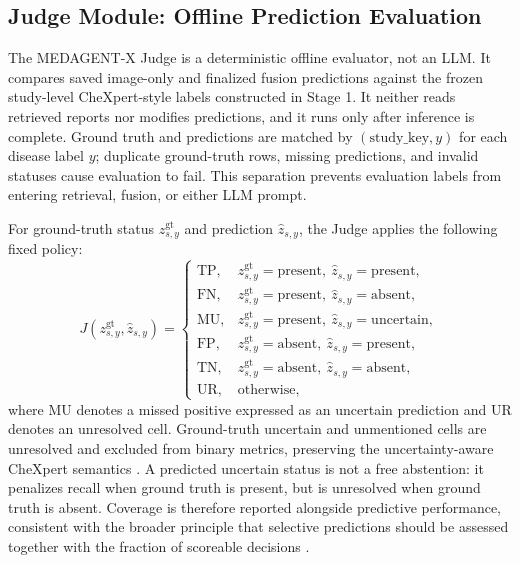 \subsection{Judge Module: Offline Prediction Evaluation}
\label{sec:judge}

The MEDAGENT-X Judge is a deterministic offline evaluator, not an LLM. It compares saved image-only and finalized fusion predictions against the frozen study-level CheXpert-style labels constructed in Stage 1. It neither reads retrieved reports nor modifies predictions, and it runs only after inference is complete. Ground truth and predictions are matched by $(\mathrm{study\_key},y)$ for each disease label $y$; duplicate ground-truth rows, missing predictions, and invalid statuses cause evaluation to fail. This separation prevents evaluation labels from entering retrieval, fusion, or either LLM prompt.

For ground-truth status $z^{\mathrm{gt}}_{s,y}$ and prediction $\widehat z_{s,y}$, the Judge applies the following fixed policy:
\[
J(z^{\mathrm{gt}}_{s,y},\widehat z_{s,y})=
\begin{cases}
\mathrm{TP}, & z^{\mathrm{gt}}_{s,y}=\mathrm{present},\ \widehat z_{s,y}=\mathrm{present},\\
\mathrm{FN}, & z^{\mathrm{gt}}_{s,y}=\mathrm{present},\ \widehat z_{s,y}=\mathrm{absent},\\
\mathrm{MU}, & z^{\mathrm{gt}}_{s,y}=\mathrm{present},\ \widehat z_{s,y}=\mathrm{uncertain},\\
\mathrm{FP}, & z^{\mathrm{gt}}_{s,y}=\mathrm{absent},\ \widehat z_{s,y}=\mathrm{present},\\
\mathrm{TN}, & z^{\mathrm{gt}}_{s,y}=\mathrm{absent},\ \widehat z_{s,y}=\mathrm{absent},\\
\mathrm{UR}, & \text{otherwise},
\end{cases}
\]
where $\mathrm{MU}$ denotes a missed positive expressed as an uncertain prediction and $\mathrm{UR}$ denotes an unresolved cell. Ground-truth uncertain and unmentioned cells are unresolved and excluded from binary metrics, preserving the uncertainty-aware CheXpert semantics \cite{irvin2019chexpert}. A predicted uncertain status is not a free abstention: it penalizes recall when ground truth is present, but is unresolved when ground truth is absent. Coverage is therefore reported alongside predictive performance, consistent with the broader principle that selective predictions should be assessed together with the fraction of scoreable decisions \cite{geifman2017selective}.

